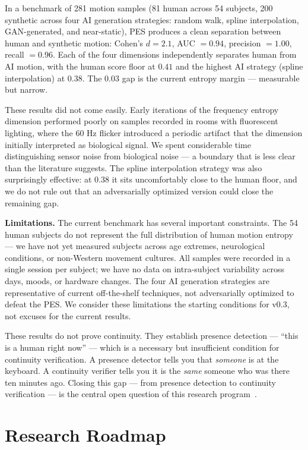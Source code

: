 \documentclass[conference]{IEEEtran}
\begin{document}
In a benchmark of 281 motion samples (81 human across 54 subjects, 200 synthetic across four AI generation strategies: random walk, spline interpolation, GAN-generated, and near-static), PES produces a clean separation between human and synthetic motion: Cohen's $d = 2.1$, AUC $= 0.94$, precision $= 1.00$, recall $= 0.96$. Each of the four dimensions independently separates human from AI motion, with the human score floor at $0.41$ and the highest AI strategy (spline interpolation) at $0.38$. The 0.03 gap is the current entropy margin — measurable but narrow.

These results did not come easily. Early iterations of the frequency entropy dimension performed poorly on samples recorded in rooms with fluorescent lighting, where the 60 Hz flicker introduced a periodic artifact that the dimension initially interpreted as biological signal. We spent considerable time distinguishing sensor noise from biological noise — a boundary that is less clear than the literature suggests. The spline interpolation strategy was also surprisingly effective: at 0.38 it sits uncomfortably close to the human floor, and we do not rule out that an adversarially optimized version could close the remaining gap.

\textbf{Limitations.} The current benchmark has several important constraints. The 54 human subjects do not represent the full distribution of human motion entropy — we have not yet measured subjects across age extremes, neurological conditions, or non-Western movement cultures. All samples were recorded in a single session per subject; we have no data on intra-subject variability across days, moods, or hardware changes. The four AI generation strategies are representative of current off-the-shelf techniques, not adversarially optimized to defeat the PES. We consider these limitations the starting conditions for v0.3, not excuses for the current results.

These results do not prove continuity. They establish presence detection — ``this is a human right now'' — which is a necessary but insufficient condition for continuity verification. A presence detector tells you that \textit{someone} is at the keyboard. A continuity verifier tells you it is the \textit{same} someone who was there ten minutes ago. Closing this gap — from presence detection to continuity verification — is the central open question of this research program~\cite{oq-001}.

\section{Research Roadmap}
\end{document}
